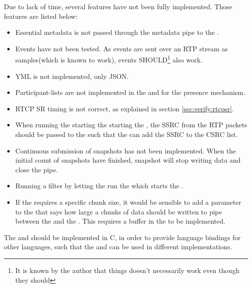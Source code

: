 \noindent{}Due to lack of time, several features have not been fully implemented.
Those features are listed below:
\begin{itemize}
	\item Essential metadata is not passed through the metadata pipe to the \con{}.
	\item Events have not been tested. As events are sent over an RTP stream as samples(which is known to work), events SHOULD\footnote{It is known by the author that things doesn't necessarily work even though they should} also work.
	\item YML is not implemented, only JSON.
	\item Participant-lists are not implemented in the \sub{} and \pub{} for the presence mechanism.
	\item RTCP SR timing is not correct, as explained in section \ref{sec:verify:rtcpsr}.
	\item When running the \sub{} starting the \pub{} starting the , the SSRC from the RTP packets should be passed to the \pub{} such that the \pub{} can add the SSRC to the CSRC list. 
	\item Continuous submission of snapshots has not been implemented. When the initial count of snapshots have finished, snapshot will stop writing data and close the pipe.
	\item Running a filter by letting the \sub{} run the \pub{} which starts the .
	\item If the  requires a specific chunk size, it would be sensible to add a parameter to the \sub{} that says how large a chunks of data should be written to pipe between the \sub{} and the . This requires a buffer in the \sub{} to be implemented.
\end{itemize}

The \pub{} and \sub{} should be implemented in C, in order to provide language bindings for other languages, such that the \pub{} and \sub{} can be used in different implementations.



